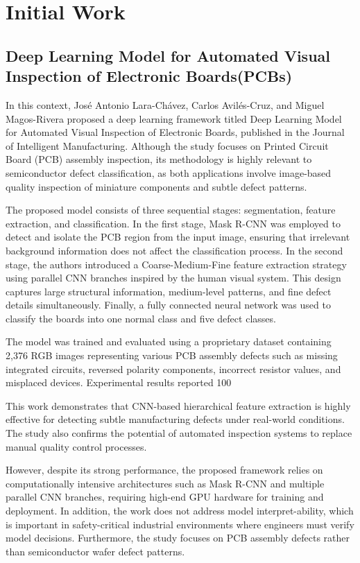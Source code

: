 \section{Initial Work}
\subsection{Deep Learning Model for Automated Visual Inspection of Electronic Boards(PCBs)}
In this context, José Antonio Lara-Chávez, Carlos Avilés-Cruz, and Miguel Magos-Rivera proposed a deep learning framework titled Deep Learning Model for Automated Visual Inspection of Electronic Boards, published in the Journal of Intelligent Manufacturing. Although the study focuses on Printed Circuit Board (PCB) assembly inspection, its methodology is highly relevant to semiconductor defect classification, as both applications involve image-based quality inspection of miniature components and subtle defect patterns.

The proposed model consists of three sequential stages: segmentation, feature extraction, and classification. In the first stage, Mask R-CNN was employed to detect and isolate the PCB region from the input image, ensuring that irrelevant background information does not affect the classification process. In the second stage, the authors introduced a Coarse-Medium-Fine feature extraction strategy using parallel CNN branches inspired by the human visual system. This design captures large structural information, medium-level patterns, and fine defect details simultaneously. Finally, a fully connected neural network was used to classify the boards into one normal class and five defect classes.

The model was trained and evaluated using a proprietary dataset containing 2,376 RGB images representing various PCB assembly defects such as missing integrated circuits, reversed polarity components, incorrect resistor values, and misplaced devices. Experimental results reported 100%

This work demonstrates that CNN-based hierarchical feature extraction is highly effective for detecting subtle manufacturing defects under real-world conditions. The study also confirms the potential of automated inspection systems to replace manual quality control processes.

However, despite its strong performance, the proposed framework relies on computationally intensive architectures such as Mask R-CNN and multiple parallel CNN branches, requiring high-end GPU hardware for training and deployment. In addition, the work does not address model interpret-ability, which is important in safety-critical industrial environments where engineers must verify model decisions. Furthermore, the study focuses on PCB assembly defects rather than semiconductor wafer defect patterns.

